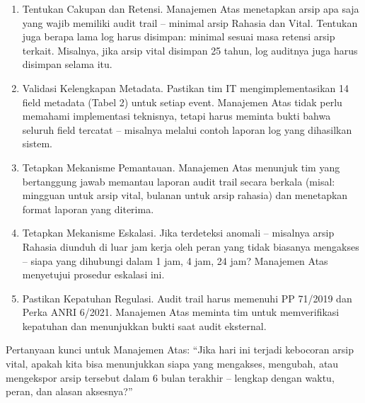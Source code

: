 \documentclass[12pt,a4paper]{report}
\begin{document}
\begin{enumerate}[leftmargin=*]
    \item Tentukan Cakupan dan Retensi. Manajemen Atas menetapkan arsip apa saja yang wajib memiliki audit trail -- minimal arsip Rahasia dan Vital. Tentukan juga berapa lama log harus disimpan: minimal sesuai masa retensi arsip terkait. Misalnya, jika arsip vital disimpan 25 tahun, log auditnya juga harus disimpan selama itu.
    \item Validasi Kelengkapan Metadata. Pastikan tim IT mengimplementasikan 14 field metadata (Tabel 2) untuk setiap event. Manajemen Atas tidak perlu memahami implementasi teknisnya, tetapi harus meminta bukti bahwa seluruh field tercatat -- misalnya melalui contoh laporan log yang dihasilkan sistem.
    \item Tetapkan Mekanisme Pemantauan. Manajemen Atas menunjuk tim yang bertanggung jawab memantau laporan audit trail secara berkala (misal: mingguan untuk arsip vital, bulanan untuk arsip rahasia) dan menetapkan format laporan yang diterima.
    \item Tetapkan Mekanisme Eskalasi. Jika terdeteksi anomali -- misalnya arsip Rahasia diunduh di luar jam kerja oleh peran yang tidak biasanya mengakses -- siapa yang dihubungi dalam 1 jam, 4 jam, 24 jam? Manajemen Atas menyetujui prosedur eskalasi ini.
    \item Pastikan Kepatuhan Regulasi. Audit trail harus memenuhi PP 71/2019 dan Perka ANRI 6/2021. Manajemen Atas meminta tim untuk memverifikasi kepatuhan dan menunjukkan bukti saat audit eksternal.
\end{enumerate}

Pertanyaan kunci untuk Manajemen Atas: ``Jika hari ini terjadi kebocoran arsip vital, apakah kita bisa menunjukkan siapa yang mengakses, mengubah, atau mengekspor arsip tersebut dalam 6 bulan terakhir -- lengkap dengan waktu, peran, dan alasan aksesnya?''

\end{document}

